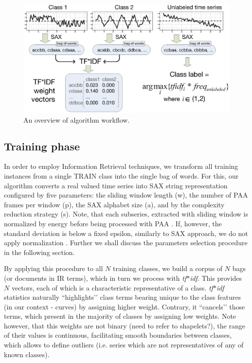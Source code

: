 \documentclass{llncs}
\begin{document}
\begin{figure}[tbp]
   \centering
   \includegraphics[width=120mm]{figures/overview.eps}
   \caption{An overview of algorithm workflow.
   }
   \label{fig:overview}
\end{figure}

\subsection{Training phase}
In order to employ Information Retrieval techniques, we transform all training instances from a
single TRAIN class into the single bag of words. For this, our algorithm converts a real valued time
series into SAX string representation configured by five parameters: the sliding window length (w),
the number of PAA frames per window (p), the SAX alphabet size (a), and by the complexity reduction
strategy (s). Note, that each subseries, extracted with sliding window is normalized by energy
before being processed with PAA \cite{goldin_kanellakis}. If, however, the standard deviation is
below a fixed epsilon, similarly to SAX approach, we do not apply normalization
\cite{sax}. Further we shall discuss the parameters selection procedure in the following section.

By applying this procedure to all $N$ training classes, we build a corpus of $N$ bags (or documents in
IR terms), which in turn we process with \textit{tf$\ast$idf}. This provides $N$ vectors, each of
which is a characteristic representative of a class. \textit{tf$\ast$idf} statistics naturally
``highlights’’ class terms bearing unique to the class features (in our context - curves) by
assigning higher weight. Contrary, it ``cancels’’ those terms, which present in the majority of
classes by assigning low weights. Note however, that this weights are not binary (need to refer to
shapelets?), the range of their values is continuous, facilitating smooth boundaries between
classes, which allows to define outliers (i.e. series which are not representatives of any of known
classes).
\end{document}
